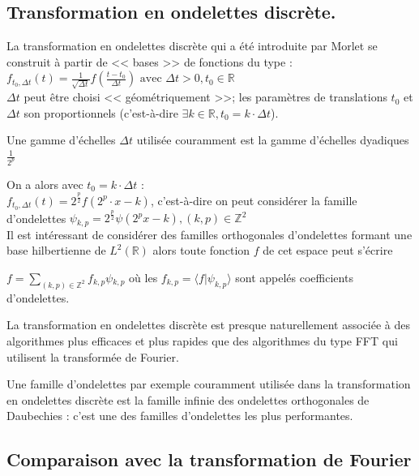 \documentclass{article}
\begin{document}
\subsection{Transformation en ondelettes discrète.}

La transformation en ondelettes discrète qui a été introduite par Morlet se construit à partir de << bases >> de fonctions du type : \\

$\displaystyle f_{t_{0},\Delta{}t}(t) = \frac{1}{\sqrt{\Delta{}t}}f\left(\frac{t-t_0}{\Delta{}t}\right) \text{ avec } \Delta{}t > 0, t_0 \in \mathbb{R}$ \\

$\Delta{}t$ peut être choisi << géométriquement >>; les paramètres de translations $t_0$ et $\Delta{}t$ son proportionnels (c'est-à-dire $\exists k \in \mathbb{R}, t_0 = k\cdot{}\Delta{}t$).

Une gamme d'échelles $\Delta{}t$ utilisée couramment est la gamme d'échelles dyadiques $\frac{1}{2^p}$

On a alors avec $t_0 = k\cdot\Delta{}t$ : \\

$\displaystyle f_{t_{0},\Delta{}t}(t) = 2^{\frac{p}{2}}f(2^{p}\cdot{}x - k)$, c'est-à-dire on peut considérer la famille d'ondelettes $\psi{}_{k,p} = 2^{\frac{p}{2}}\psi{}(2^{p}x - k ), (k,p) \in \mathbb{Z}^2$ \\

Il est intéressant de considérer des familles orthogonales d'ondelettes formant une base hilbertienne de $L^2(\mathbb{R})$ alors toute fonction $f$ de cet espace peut s'écrire 

$\displaystyle f = \sum_{(k,p) \in \mathbb{Z}^2}f_{k,p}\psi{}_{k,p}$ où les $f_{k,p} = \langle{}f|\psi_{k,p}\rangle$ sont appelés coefficients d'ondelettes.

La transformation en ondelettes discrète est presque naturellement associée à des algorithmes plus efficaces et plus rapides que des algorithmes du type FFT qui utilisent la transformée de Fourier.

Une famille d’ondelettes par exemple couramment utilisée dans la transformation en ondelettes discrète est la famille infinie des ondelettes orthogonales de Daubechies : c’est une des familles d’ondelettes les plus performantes.




\subsection{Comparaison avec la transformation de Fourier}
\end{document}
